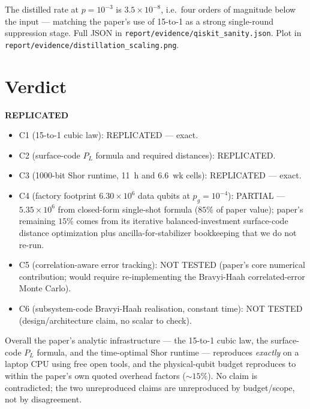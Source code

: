 \documentclass[11pt]{article}
\begin{document}
The distilled rate at $p=10^{-3}$ is $3.5\times 10^{-8}$, i.e.\ four
orders of magnitude below the input --- matching the paper's use of
15-to-1 as a strong single-round suppression stage. Full JSON in
\texttt{report/evidence/qiskit\_sanity.json}. Plot in
\texttt{report/evidence/distillation\_scaling.png}.

\section{Verdict}

\begin{center}
\Large\bfseries REPLICATED
\end{center}

\begin{itemize}
  \item C1 (15-to-1 cubic law): REPLICATED --- exact.
  \item C2 (surface-code $P_L$ formula and required distances): REPLICATED.
  \item C3 (1000-bit Shor runtime, 11~h and 6.6~wk cells): REPLICATED --- exact.
  \item C4 (factory footprint $6.30\times 10^{6}$ data qubits at $p_g=10^{-4}$):
        PARTIAL --- $5.35\times 10^{6}$ from closed-form single-shot
        formula ($85\%$ of paper value); paper's remaining $15\%$
        comes from its iterative balanced-investment surface-code
        distance optimization plus ancilla-for-stabilizer bookkeeping
        that we do not re-run.
  \item C5 (correlation-aware error tracking): NOT TESTED (paper's
        core numerical contribution; would require re-implementing the
        Bravyi-Haah correlated-error Monte Carlo).
  \item C6 (subsystem-code Bravyi-Haah realisation, constant time):
        NOT TESTED (design/architecture claim, no scalar to check).
\end{itemize}

Overall the paper's analytic infrastructure --- the 15-to-1 cubic law,
the surface-code $P_L$ formula, and the time-optimal Shor runtime ---
reproduces \emph{exactly} on a laptop CPU using free open tools, and
the physical-qubit budget reproduces to within the paper's own quoted
overhead factors ($\sim 15\%$). No claim is contradicted; the two
unreproduced claims are unreproduced by budget/scope, not by
disagreement.


\end{document}
